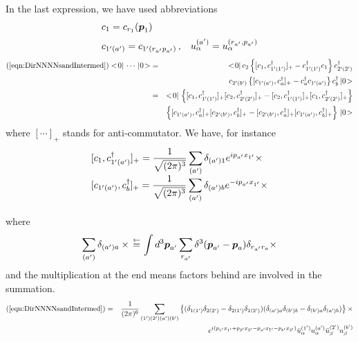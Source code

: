 In the last expression, we have used abbreviations
\begin{eqnarray}
\begin{array}{l}
c_1 = c_{r_1}(\bld{p}_1)\,
\vspace{2mm}
\\
c_{1' (a')} = c_{1'(r_{a'} p_{a'})}\,,
\hspace{3mm}
u_\alpha^{(a')} = u_\alpha^{(r_{a'}, p_{a'})}
\end{array}
\end{eqnarray}
\begin{eqnarray}
(\ref{eqn:DirNNNNsandIntermed}) <\! 0 |\, \cdots  \,| 0 \!>
&=&
<\! 0 |\, c_{2}
\left\{
[ c_1, c^\dagger_{1'(1')}]_+ - c^\dagger_{1'(1')} c_1
\right\}
 c^\dagger_{2'(2')} 
 \nonumber\\
 &&
 c_{2'(b')} 
\left\{
[c_{1'(a')}, c^\dagger_{a} ]_+ - c^\dagger_{a} c_{1'(a')}
\right\}
c^\dagger_{b} \,| 0 \!>
 \nonumber\\
 &=&
<\! 0 |\, 
\left\{
[ c_1, c^\dagger_{1'(1')}]_+
[c_{2}, c^\dagger_{2'(2')} ]_+
-
[c_{2},  c^\dagger_{1'(1')}]_+ 
[c_1, c^\dagger_{2'(2')} ]_+
\right\}
 \nonumber\\
 &&
\left\{
[c_{1'(a')}, c^\dagger_{a} ]_+ 
[ c_{2'(b')}, c^\dagger_{b}]_+ 
- 
[ c_{2'(b')}, c^\dagger_{a}]_+ 
[ c_{1'(a')}, c^\dagger_{b}]_+ 
\right\}
 \,| 0 \!>
 \nonumber\\ 
\label{eqn:DirNNNNvacsandInterm}
\end{eqnarray}
where $[\cdots]_+$ stands for anti-commutator. 
We have, for instance
\begin{eqnarray}
\begin{array}{l}
\displaystyle
[c_1, c^\dagger_{1' (a') }]_+
=
\frac{1}{\sqrt{(2\pi)^3}}
\sum_{(a')} \delta_{(a') 1} e^{i p_{a'} x_{1'}} \times
\\
\displaystyle
[ c_{1'(a')}, c^\dagger_{b}]_+ 
=
\frac{1}{\sqrt{(2\pi)^3}}
\sum_{(a')} \delta_{(a') b} e^{-i p_{a'} x_{1'} } \times
\vspace{2mm}
\end{array}
\end{eqnarray}
where
\begin{eqnarray}
\sum_{(a')} \delta_{(a') a} \times
\,\mbox{$\stackrel{\leftarrow}{=}$}\,
\int d^3 \mbox{\boldmath $p$}_{a'} \sum_{r_{a'}}
\delta^3(\mbox{\boldmath $p$}_{a'} - \mbox{\boldmath $p$}_a) \delta_{r_{a'} r_a} \times
\end{eqnarray}
and the multiplication at the end means
factors behind are involved in the summation. 
\begin{eqnarray}
(\ref{eqn:DirNNNNsandIntermed}) 
&=&
\frac{1}{(2\pi)^6}
\sum_{(1')(2')(a')(b')}
\left\{
(
\delta_{1(1')}\delta_{2(2')}
-
\delta_{2(1')}\delta_{1(2')}
)
(
\delta_{(a')a}\delta_{(b')b}
-
\delta_{(b')a}\delta_{(a')b}
)
\right\}
 \times
\nonumber\\
&&
e^{i(p_{1'} x_{1'} + p_{2'} x_{2'}  - p_{a'} x_{1'} - p_{b'} x_{2'}    )}
\bar{u}_\alpha^{(1')} u_\alpha^{(a')} \bar{u}_\beta^{(2')} u_\beta^{(b')}
\label{eqn:DirNNNNabbamp}
\end{eqnarray}
